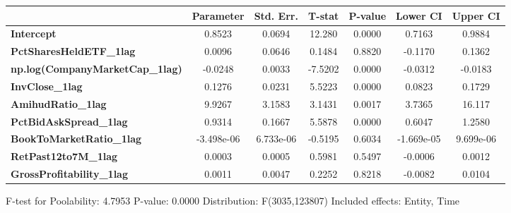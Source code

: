 \begin{center}
\begin{tabular}{lclc}
\bottomrule
\end{tabular}
\begin{tabular}{lcccccc}
                                        & \textbf{Parameter} & \textbf{Std. Err.} & \textbf{T-stat} & \textbf{P-value} & \textbf{Lower CI} & \textbf{Upper CI}  \\
\midrule
\textbf{Intercept}                      &       0.8523       &       0.0694       &      12.280     &      0.0000      &       0.7163      &       0.9884       \\
\textbf{PctSharesHeldETF\_1lag}         &       0.0096       &       0.0646       &      0.1484     &      0.8820      &      -0.1170      &       0.1362       \\
\textbf{np.log(CompanyMarketCap\_1lag)} &      -0.0248       &       0.0033       &     -7.5202     &      0.0000      &      -0.0312      &      -0.0183       \\
\textbf{InvClose\_1lag}                 &       0.1276       &       0.0231       &      5.5223     &      0.0000      &       0.0823      &       0.1729       \\
\textbf{AmihudRatio\_1lag}              &       9.9267       &       3.1583       &      3.1431     &      0.0017      &       3.7365      &       16.117       \\
\textbf{PctBidAskSpread\_1lag}          &       0.9314       &       0.1667       &      5.5878     &      0.0000      &       0.6047      &       1.2580       \\
\textbf{BookToMarketRatio\_1lag}        &     -3.498e-06     &     6.733e-06      &     -0.5195     &      0.6034      &     -1.669e-05    &     9.699e-06      \\
\textbf{RetPast12to7M\_1lag}            &       0.0003       &       0.0005       &      0.5981     &      0.5497      &      -0.0006      &       0.0012       \\
\textbf{GrossProfitability\_1lag}       &       0.0011       &       0.0047       &      0.2252     &      0.8218      &      -0.0082      &       0.0104       \\
\bottomrule
\end{tabular}
\end{center}

F-test for Poolability: 4.7953 \newline
 P-value: 0.0000 \newline
 Distribution: F(3035,123807) \newline
  \newline
 Included effects: Entity, Time